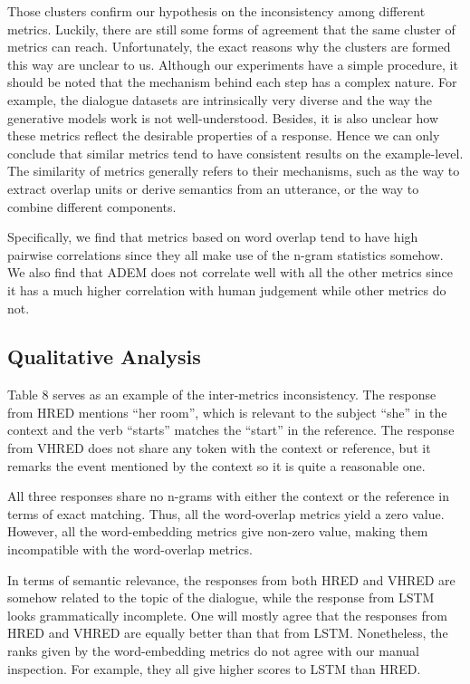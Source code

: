 \documentclass[conference]{IEEEtran}
\begin{document}
    Those clusters confirm our hypothesis on the inconsistency among different metrics. Luckily, there are still some forms of agreement that the same cluster of metrics can reach. Unfortunately, the exact reasons why the clusters are formed this way are unclear to us. Although our experiments have a simple procedure, it should be noted that the mechanism behind each step has a complex nature. For example, the dialogue datasets are intrinsically very diverse and the way the generative models work is not well-understood. Besides, it is also unclear how these metrics reflect the desirable properties of a response. Hence we can only conclude that similar metrics tend to have consistent results on the example-level. The similarity of metrics generally refers to their mechanisms, such as the way to extract overlap units or derive semantics from an utterance, or the way to combine different components.

    Specifically, we find that metrics based on word overlap tend to have high pairwise correlations since they all make use of the n-gram statistics somehow. We also find that ADEM does not correlate well with all the other metrics since it has a much higher correlation with human judgement while other metrics do not.

    \subsection{Qualitative Analysis}
    
    Table 8 serves as an example of the inter-metrics inconsistency. The response from HRED mentions ``her room'', which is relevant to the subject ``she'' in the context and the verb ``starts'' matches the ``start'' in the reference. The response from VHRED does not share any token with the context or reference, but it remarks the event mentioned by the context so it is quite a reasonable one.

    All three responses share no n-grams with either the context or the reference in terms of exact matching. Thus, all the word-overlap metrics yield a zero value. However, all the word-embedding metrics give non-zero value, making them incompatible with the word-overlap metrics.

    In terms of semantic relevance, the responses from both HRED and VHRED are somehow related to the topic of the dialogue, while the response from LSTM looks grammatically incomplete. One will mostly agree that the responses from HRED and VHRED are equally better than that from LSTM. Nonetheless, the ranks given by the word-embedding metrics do not agree with our manual inspection. For example, they all give higher scores to LSTM than HRED.
\end{document}
